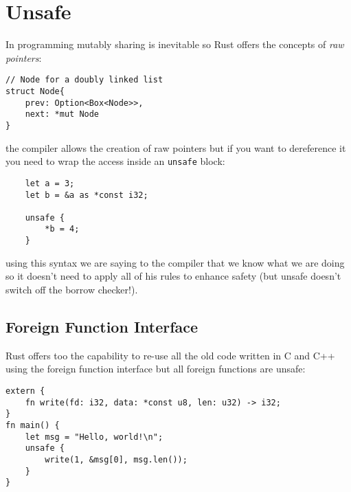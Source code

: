\section{Unsafe}
In programming mutably sharing is inevitable so Rust offers the concepts of \emph{raw pointers}:
\begin{verbatim}
// Node for a doubly linked list
struct Node{
    prev: Option<Box<Node>>,
    next: *mut Node
}
\end{verbatim}
the compiler allows the creation of raw pointers but if you want to dereference it you need to wrap the access inside an \verb|unsafe| block:
\begin{verbatim}
    let a = 3;
    let b = &a as *const i32;

    unsafe {
        *b = 4;
    }
\end{verbatim}
using this syntax we are saying to the compiler that we know what we are doing so it doesn't need to apply all of his rules to enhance safety (but unsafe doesn't switch off the borrow checker!).

\subsection{Foreign Function Interface}
Rust offers too the capability to re-use all the old code written in C and C++ using the foreign function interface but all foreign functions are unsafe:
\begin{verbatim}
extern {
    fn write(fd: i32, data: *const u8, len: u32) -> i32;
}
fn main() {
    let msg = "Hello, world!\n";
    unsafe {
        write(1, &msg[0], msg.len());
    }
}

\end{verbatim}
